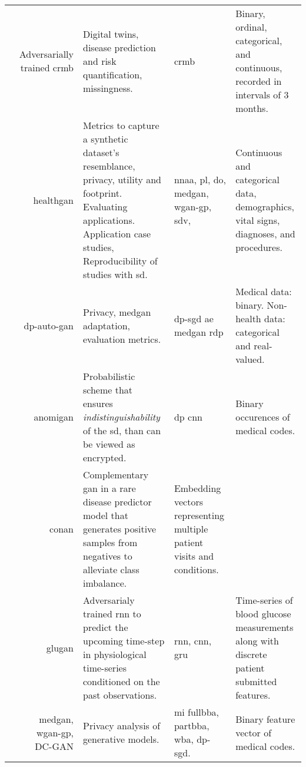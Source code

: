 \begin{center}
\begin{longtable}[l]{@{}p{}Rp{0.25\textwidth}Mp{0.20\textwidth}@{}}
        \citeauthor{walsh2020generating} & Adversarially trained \gls{crmb}
        & Digital twins, disease prediction and risk quantification, missingness.  & \gls{crmb}
        &  Binary, ordinal, categorical, and continuous, recorded in intervals of 3 months.\\
        
        \citeauthor{Yale_2020} & \gls{healthgan}
        & Metrics to capture a synthetic dataset’s resemblance, privacy, utility and footprint. Evaluating applications. Application case studies, Reproducibility of studies with \gls{sd}. & \gls{nnaa}, \gls{pl}, \gls{do}, \gls{medgan}, \gls{wgan-gp}, \gls{sdv}, 
        & Continuous and categorical data, demographics, vital signs, diagnoses, and procedures.\\
        
        \citeauthor{tanti2019} & \gls{dp-auto-gan}
        & Privacy, \gls{medgan} adaptation, evaluation metrics. & \gls{dp-sgd} \gls{ae} \gls{medgan} \gls{rdp}
        & Medical data: binary. Non-health data: categorical and real-valued.\\
        
        \citeauthor{BaeAnomiGAN2020} & \gls{anomigan}
        & Probabilistic scheme that ensures \textit{indistinguishability} of the \gls{sd}, than can be viewed as encrypted. & \gls{dp} \gls{cnn}
        & Binary occurences of medical codes.\\
        
        \citeauthor{cui2019conan} & \gls{conan}
        & Complementary \gls{gan} in a rare disease predictor model that generates positive samples from negatives to alleviate class imbalance.
        & Embedding vectors representing multiple patient visits and conditions.\\
        
        \citeauthor{zhu_2020} & \gls{glugan}
        & Adversarialy trained \gls{rnn} to predict the upcoming time-step in physiological time-series conditioned on the past observations. & \gls{rnn}, \gls{cnn}, \gls{gru}
        & Time-series of blood glucose measurements along with discrete patient submitted features.\\
        
        \citeauthor{chen2019ganleaks} & \gls{medgan}, \gls{wgan-gp}, DC-GAN
        & Privacy analysis of generative models.  & \gls{mi} \gls{fullbba}, \gls{partbba}, \gls{wba}, \gls{dp-sgd}.
        & Binary feature vector of medical codes.\\
        

\end{longtable}
\end{center}
